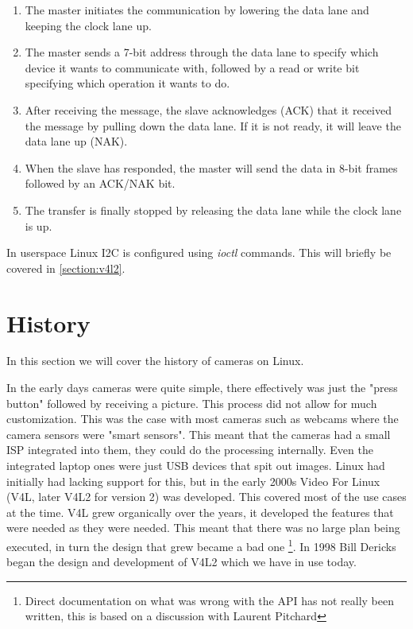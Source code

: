 \begin{enumerate}
    \item The master initiates the communication by lowering the data lane and
        keeping the clock lane up.

    \item The master sends a 7-bit address through the data lane to specify
        which device it wants to communicate with, followed by a read or write
        bit specifying which operation it wants to do.

    \item After receiving the message, the slave acknowledges (ACK) that it received
        the message by pulling down the data lane. If it is not ready, it will
        leave the data lane up (NAK).

    \item When the slave has responded, the master will send the data in 8-bit
        frames followed by an ACK/NAK bit.

    \item The transfer is finally stopped by releasing the data lane while the
        clock lane is up.
\end{enumerate}

In userspace Linux I2C is configured using \textit{ioctl} commands. This will
briefly be covered in \cref{section:v4l2}.

\section{History}
In this section we will cover the history of cameras on Linux.

In the early days cameras were quite simple, there effectively was just the
"press button" followed by receiving a picture. This process did not allow for
much customization. This was the case with most cameras such as webcams where
the camera sensors were "smart sensors". This meant that the cameras had a small
ISP integrated into them, they could do the processing internally. Even the
integrated laptop ones were just USB devices that spit out images. Linux had
initially had lacking support for this, but in the early 2000s Video For Linux
(V4L, later V4L2 for version 2) was developed. This covered most of the use
cases at the time. V4L grew organically over the years, it developed the
features that were needed as they were needed. This meant that there was no
large plan being executed, in turn the design that grew became a bad one
\footnote{Direct documentation on what was wrong with the API has not really
been written, this is based on a discussion with Laurent Pitchard}.
In 1998 Bill Dericks began the design and development of V4L2 which we have in
use today.

